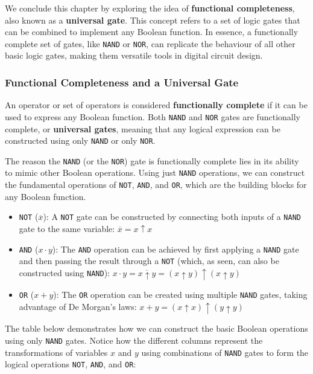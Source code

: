 We conclude this chapter by exploring the idea of \textbf{functional completeness}, also known as a \textbf{universal gate}. This concept refers to a set of logic gates that can be combined to implement any Boolean function. In essence, a functionally complete set of gates, like \texttt{NAND} or \texttt{NOR}, can replicate the behaviour of all other basic logic gates, making them versatile tools in digital circuit design.


\subsubsection*{Functional Completeness and a Universal Gate}
An operator or set of operators is considered \textbf{functionally complete} if it can be used to express any Boolean function. Both \texttt{NAND} and \texttt{NOR} gates are functionally complete, or \textbf{universal gates}, meaning that any logical expression can be constructed using only \texttt{NAND} or only \texttt{NOR}.

The reason the \texttt{NAND} (or the \texttt{NOR}) gate is functionally complete lies in its ability to mimic other Boolean operations. Using just \texttt{NAND} operations, we can construct the fundamental operations of \texttt{NOT}, \texttt{AND}, and \texttt{OR}, which are the building blocks for any Boolean function.

\begin{itemize}
\setlength{\itemsep}{10pt}
    \item \texttt{NOT} (\(\overline{x}\)): A \texttt{NOT} gate can be constructed by connecting both inputs of a \texttt{NAND} gate to the same variable:
    \(
    \overline{x} = x \uparrow x
    \)

    \item \texttt{AND} (\(x \cdot y\)): The \texttt{AND} operation can be achieved by first applying a \texttt{NAND} gate and then passing the result through a \texttt{NOT} (which, as seen, can also be constructed using \texttt{NAND}): \newline
   $x \cdot y=\overline{x \uparrow y}=(x \uparrow y) \uparrow(x \uparrow y)$

    \item \texttt{OR} (\(x + y\)): The \texttt{OR} operation can be created using multiple \texttt{NAND} gates, taking advantage of De Morgan’s laws:
    \(
    x + y = (x \uparrow x) \uparrow (y \uparrow y)
    \)
\end{itemize}


The table below demonstrates how we can construct the basic Boolean operations using only \texttt{NAND} gates. Notice how the different columns represent the transformations of variables $x$ and $y$ using combinations of \texttt{NAND} gates to form the logical operations \texttt{NOT}, \texttt{AND}, and \texttt{OR}:

